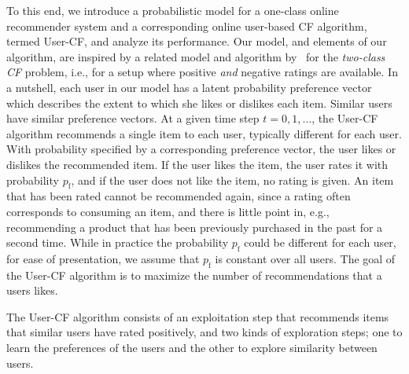 \documentclass{article}
\newcommand\pf{p_{\mathrm{f}}}
\begin{document}
To this end, we introduce a probabilistic model for a one-class online recommender system and a corresponding online user-based CF algorithm, termed User-CF, and analyze its performance. 
Our model, and elements of our algorithm, are inspired by a related model and algorithm by~\citet{bresler_latent_2014} for the \emph{two-class CF} problem, i.e., for a setup where positive \emph{and} negative ratings are available. 
In a nutshell, each user in our model has a latent probability preference vector which describes the extent to which she likes or dislikes each item. Similar users have similar preference vectors. %
At a given time step $t=0,1,\ldots$, the User-CF algorithm recommends a single item to each user, typically different for each user. 
With probability specified by a corresponding preference vector, the user likes or dislikes the recommended item. 
If the user likes the item, the user rates it with probability $\pf$, and if the user does not like the item, no rating is given. 
An item that has been rated cannot be recommended again, since a rating often corresponds to consuming an item, and there is little point in, e.g., recommending a product that has been previously purchased in the past for a second time. 
While in practice the probability $\pf$ could be different for each user, for ease of presentation, we assume that $\pf$ is constant over all users. 
The goal of the User-CF algorithm is to maximize the number of recommendations that a users likes. 

The User-CF algorithm consists of an exploitation step that recommends items that similar users have rated positively, and two kinds of exploration steps; one to learn the preferences of the users and the other to explore similarity between users. 
\end{document}
